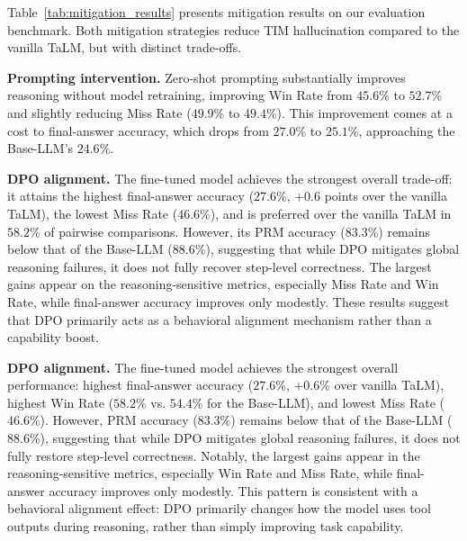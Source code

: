 \documentclass[11pt]{article}
\def \task{\textsc{TIM}\xspace}
\begin{document}
Table~\ref{tab:mitigation_results} presents mitigation results on our evaluation benchmark. Both mitigation strategies reduce \task{} hallucination compared to the vanilla TaLM, but with distinct trade-offs.

\noindent
\textbf{Prompting intervention.} Zero-shot prompting substantially improves reasoning without model retraining, improving Win Rate from $45.6\%$ to $52.7\%$ and slightly reducing Miss Rate ($49.9\%$ to $49.4\%$). This improvement comes at a cost to final-answer accuracy, which drops from $27.0\%$ to $25.1\%$, approaching the Base-LLM's $24.6\%$.

\noindent
\textbf{DPO alignment.}  The fine-tuned model achieves the strongest overall trade-off: it attains the highest final-answer accuracy ($27.6\%$, +0.6 points over the vanilla TaLM), the lowest Miss Rate ($46.6\%$), and is preferred over the vanilla TaLM in $58.2\%$ of pairwise comparisons. However, its PRM accuracy ($83.3\%$) remains below that of the Base-LLM ($88.6\%$), suggesting that while DPO mitigates global reasoning failures, it does not fully recover step-level correctness. The largest gains appear on the reasoning-sensitive metrics, especially Miss Rate and Win Rate, while final-answer accuracy improves only modestly. These results suggest that DPO primarily acts as a behavioral alignment mechanism rather than a capability boost.


\textbf{DPO alignment.} The fine-tuned model achieves the strongest overall performance: highest final-answer accuracy ($27.6\%$, +0.6\% over vanilla TaLM), highest Win Rate ($58.2\%$ vs. $54.4\%$ for the Base-LLM), and lowest Miss Rate ($46.6\%$). However, PRM accuracy ($83.3\%$) remains below that of the Base-LLM ($88.6\%$), suggesting that while DPO mitigates global reasoning failures, it does not fully restore step-level correctness. Notably, the largest gains appear in the reasoning-sensitive metrics, especially Win Rate and Miss Rate, while final-answer accuracy improves only modestly. This pattern is consistent with a behavioral alignment effect: DPO primarily changes how the model uses tool outputs during reasoning, rather than simply improving task capability.

\end{document}
